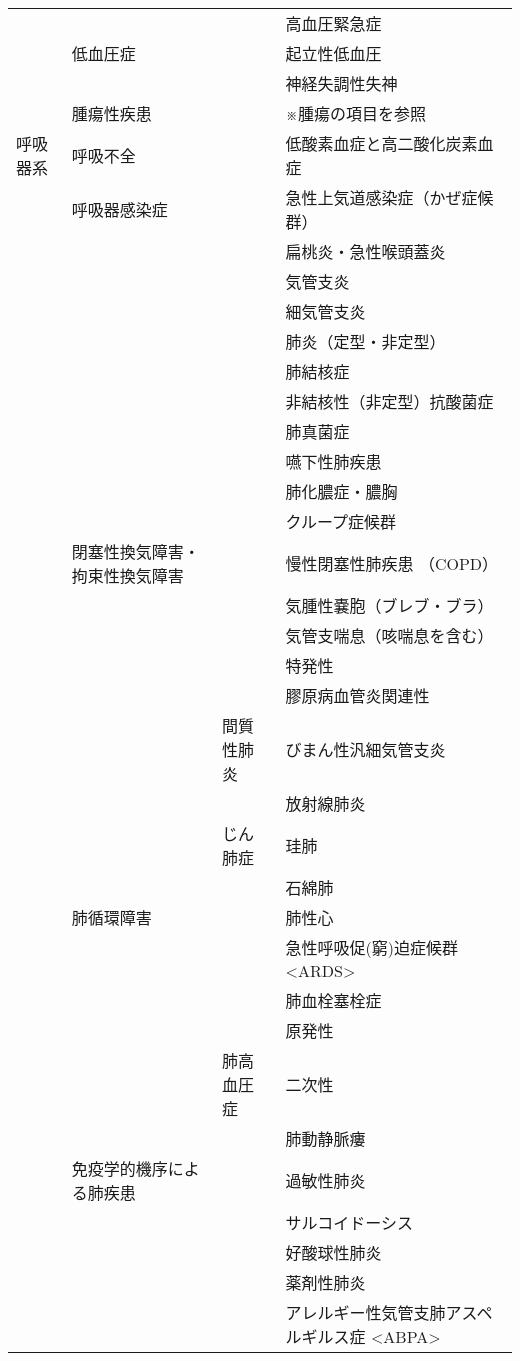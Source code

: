\begin{xltabular}{\linewidth}{XXXX}
 &  &  & 高血圧緊急症 \\
 & 低血圧症 &  & 起立性低血圧 \\
 &  &  & 神経失調性失神 \\
 & 腫瘍性疾患 &  & ※腫瘍の項目を参照 \\
呼吸器系 & 呼吸不全 &  & 低酸素血症と高二酸化炭素血症 \\
 & 呼吸器感染症 &  & 急性上気道感染症（かぜ症候群） \\
 &  &  & 扁桃炎・急性喉頭蓋炎 \\
 &  &  & 気管支炎 \\
 &  &  & 細気管支炎 \\
 &  &  & 肺炎（定型・非定型） \\
 &  &  & 肺結核症 \\
 &  &  & 非結核性（非定型）抗酸菌症 \\
 &  &  & 肺真菌症 \\
 &  &  & 嚥下性肺疾患 \\
 &  &  & 肺化膿症・膿胸 \\
 &  &  & クループ症候群 \\
 & 閉塞性換気障害・拘束性換気障害 &  & 慢性閉塞性肺疾患 （COPD） \\
 &  &  & 気腫性嚢胞（ブレブ・ブラ） \\
 &  &  & 気管支喘息（咳喘息を含む） \\
 &  &  & 特発性 \\
 &  &  & 膠原病血管炎関連性 \\
 &  & 間質性肺炎 & びまん性汎細気管支炎 \\
 &  &  & 放射線肺炎 \\
 &  & じん肺症 & 珪肺 \\
 &  &  & 石綿肺 \\
 & 肺循環障害 &  & 肺性心 \\
 &  &  & 急性呼吸促(窮)迫症候群 <ARDS> \\
 &  &  & 肺血栓塞栓症 \\
 &  &  & 原発性 \\
 &  & 肺高血圧症 & 二次性 \\
 &  &  & 肺動静脈瘻 \\
 & 免疫学的機序による肺疾患 &  & 過敏性肺炎 \\
 &  &  & サルコイドーシス \\
 &  &  & 好酸球性肺炎 \\
 &  &  & 薬剤性肺炎 \\
 &  &  & アレルギー性気管支肺アスペルギルス症 <ABPA> \\

\end{xltabular}
